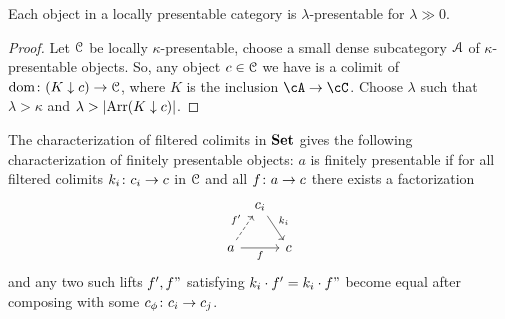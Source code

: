 \documentclass[a4paper,11pt,oneside,openany]{scrbook}
\begin{document}
\begin{prop}
	Each object in a locally presentable category is $ \lambda $-presentable
	for $ \lambda \gg 0 $.
\end{prop}
\begin{proof}
	Let $ \operatorname{\mathcal{C}} $ be locally $\kappa $-presentable, choose a small dense subcategory $\operatorname{\mathcal{A}} $ of $ \kappa $-presentable objects.
	So, any object $ c \in \operatorname{\mathcal{C}} $ we have is a colimit of $\operatorname{dom}\colon (K\downarrow
    c)\rightarrow\operatorname{\mathcal{C}}$, where $K$ is the inclusion $\cA\rightarrow\cC$.
	Choose $ \lambda $ such that $ \lambda > \kappa $ and $ \lambda >
    \left\lvert \operatorname{Arr}(K\downarrow c) \right\rvert $.
\end{proof}
The characterization of filtered colimits in $ {\normalfont\textbf{Set}} $ gives the following characterization of finitely presentable objects:
$ a $ is finitely presentable if for all filtered colimits $ k_i \colon c_i \to c $ in $ \operatorname{\mathcal{C}} $ and all $ f\colon a \to c $ there exists a factorization
\begin{displaymath}
	\begin{tikzcd}[column sep=tiny]
		& c_i \arrow[dr, "k_i"]&\\
		a \arrow[ur, dashed, "f'"]\arrow[rr, "f"']&& c
	\end{tikzcd}
\end{displaymath}
and any two such lifts $f',f"$ satisfying $k_i\cdot f'=k_i\cdot f"$ become equal after composing with some $c_\phi\colon c_i\to c_j$.
\end{document}
